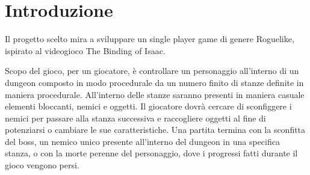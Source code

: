 \section*{Introduzione}
Il progetto scelto mira a sviluppare un single player game di genere Roguelike, 
ispirato al videogioco The Binding of Isaac.

Scopo del gioco, per un giocatore, è controllare un personaggio all’interno di un dungeon 
composto in modo procedurale da un numero finito di stanze definite in maniera procedurale. 
All’interno delle stanze saranno presenti in maniera casuale elementi bloccanti, nemici e oggetti. 
Il giocatore dovrà cercare di sconfiggere i nemici per passare alla stanza successiva e 
raccogliere oggetti al fine di potenziarsi o cambiare le sue caratteristiche. 
Una partita termina con la sconfitta del boss, un nemico unico presente all’interno del dungeon  in una specifica stanza, 
o con la morte perenne del personaggio, dove i progressi fatti durante il gioco vengono persi.
